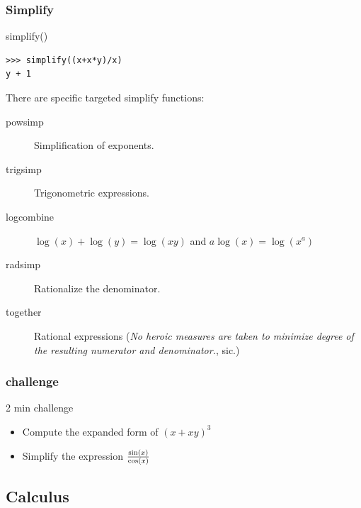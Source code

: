 \documentclass[10pt,colorlinks]{beamer}
\begin{document}
\begin{frame}[fragile]\frametitle{Simplify}
\begin{block}{simplify()}
\begin{verbatim}
>>> simplify((x+x*y)/x)
y + 1
\end{verbatim}

There are specific targeted simplify functions:
\begin{description}
    \item[powsimp] Simplification  of exponents.
    \item[trigsimp] Trigonometric expressions.
    \item[logcombine] $\log(x)+\log(y) = \log(xy)$ and $a \log(x) = \log(x^a)$
    \item[radsimp] Rationalize the denominator.
    \item[together] Rational expressions (\emph{No heroic measures are taken to minimize degree of the resulting numerator and denominator.}, sic.)
    
\end{description}
\end{block}

\end{frame}

\begin{frame}[fragile]\frametitle{challenge}
\begin{block}{2 min challenge}

\begin{itemize}
    \item Compute the expanded form of $(x+xy)^3$
    \item Simplify the expression $\sin(x) \over \cos(x)$
\end{itemize}

\end{block}

\end{frame}






\subsection{Calculus} %
\label{sub:Calculus}
\end{document}
